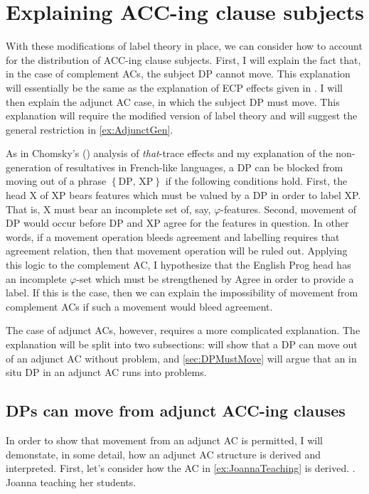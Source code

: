 \documentclass[MilwayThesis]{subfiles}
\begin{document}
\section{Explaining ACC-ing clause subjects}
With these modifications of label theory in place, we can consider how to account for the distribution of ACC-ing clause subjects.
First, I will explain the fact that, in the case of complement ACs, the subject DP cannot move.
This explanation will essentially be the same as the explanation of ECP effects given in \cite{chomsky2015problems}.
I will then explain the adjunct AC case, in which the subject DP must move.
This explanation will require the modified version of label theory and will suggest the general restriction in \cref{ex:AdjunctGen}.

As in Chomsky's (\citeyear{chomsky2015problems}) analysis of \textit{that}-trace effects and my explanation of the non-generation of resultatives in French-like languages, a DP can be blocked from moving out of a phrase $\left\{ \text{DP, XP} \right\}$ if the following conditions hold.
First, the head X of XP bears features which must be valued by a DP in order to label XP.
That is, X must bear an incomplete set of, say, $\varphi$-features.
Second, movement of DP would occur before DP and XP agree for the features in question.
In other words, if a movement operation bleeds agreement and labelling requires that agreement relation, then that movement operation will be ruled out.
Applying this logic to the complement AC, I hypothesize that the English Prog head has an incomplete $\varphi$-set which must be strengthened by Agree in order to provide a label.
If this is the case, then we can explain the impossibility of movement from complement ACs if such a movement would bleed agreement.

The case of adjunct ACs, however, requires a more complicated explanation.
The explanation will be split into two subsections:  will show that a DP can move out of an adjunct AC without problem, and \cref{sec:DPMustMove} will argue that an in situ DP in an adjunct AC runs into problems.

\subsection{DPs can move from adjunct ACC-ing clauses}\label{sec:DPCanMove}
In order to show that movement from an adjunct AC is permitted, I will demonstate, in some detail, how an adjunct AC structure is derived and interpreted.
First, let's consider how the AC in \cref{ex:JoannaTeaching} is derived.
\ex.\label{ex:JoannaTeaching} Joanna teaching her students.
\end{document}
